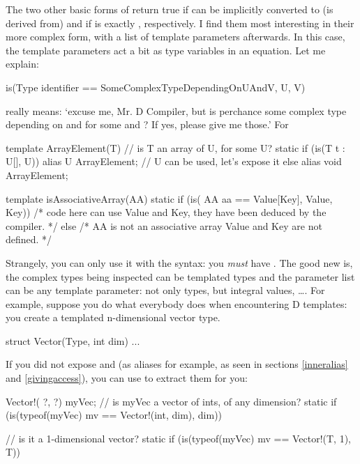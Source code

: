 The two other basic forms of  return true if  can be implicitly converted to (is derived from)  and if  is exactly , respectively.  I find them most interesting in their more complex form, with a list of template parameters afterwards. In this case, the template parameters act a bit as type variables in an equation. Let me explain:

\begin{dcode}
is(Type identifier == SomeComplexTypeDependingOnUAndV, U, V)
\end{dcode}

really means: `excuse me, Mr. D Compiler, but is  perchance some complex type depending on  and  for some  and ? If yes, please give me those.'
For 

\begin{dcode}
template ArrayElement(T)
{
    // is T an array of U, for some U?
    static if (is(T t : U[], U)) 
        alias U ArrayElement; // U can be used, let's expose it
    else
        alias void ArrayElement;
}

template isAssociativeArray(AA)
{
    static if (is( AA aa == Value[Key], Value, Key))  
        /* code here can use Value and Key, 
           they have been deduced by the compiler. */ 
    else
        /* AA is not an associative array
          Value and Key are not defined. */
}
\end{dcode}

Strangely, you can only use it with the  syntax: you \emph{must} have . The good new is, the complex types being inspected can be templated types and the parameter list can be any template parameter: not only types, but integral values, \ldots.
For example, suppose you do what everybody does when encountering D templates: you create a templated  n-dimensional vector type.

\begin{dcode}
struct Vector(Type, int dim) { ... }
\end{dcode}

If you did not expose  and  (as aliases for example, as seen in sections \ref{inneralias} and \ref{givingaccess}), you can use  to extract them for you:

\begin{dcode}
Vector!( ?, ?) myVec;
// is myVec a vector of ints, of any dimension?
static if (is(typeof(myVec) mv == Vector!(int, dim), dim))

// is it a 1-dimensional vector?
static if (is(typeof(myVec) mv == Vector!(T, 1), T))
\end{dcode}

